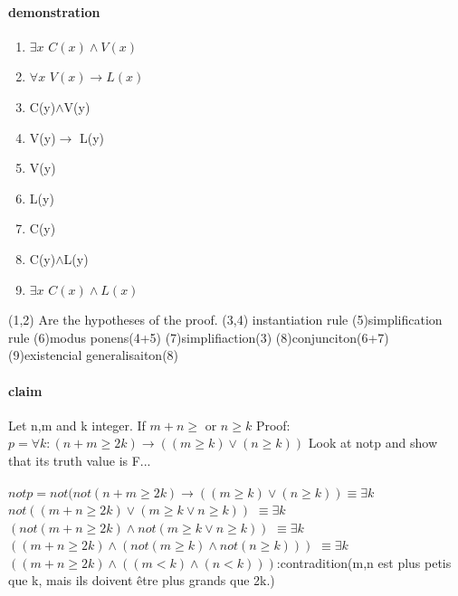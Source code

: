 \documentclass[a4paper,10pt]{article}
\begin{document}
\paragraph{demonstration}
\begin{enumerate}
 \item $\exists x$ $C(x)\wedge V(x)$
 \item $\forall x$ $V(x)\longrightarrow L(x)$
 \item C(y)$\wedge$V(y)
 \item V(y)$\longrightarrow$ L(y)
 \item V(y)
 \item L(y)
 \item C(y)
 \item C(y)$\wedge$L(y)
 \item $\exists x$ $C(x)\wedge L(x)$
\end{enumerate}

(1,2) Are the hypotheses of the proof.
\newline
(3,4) instantiation rule 
\newline
(5)simplification rule 
\newline
(6)modus ponens(4+5)
\newline
(7)simplifiaction(3)
\newline
(8)conjunciton(6+7)
\newline
(9)existencial generalisaiton(8)
\paragraph{claim}
Let n,m and k integer. If $m+n\geq$ or $n\geq k$
\newline
Proof:
$p=\forall k:(n+m\geq 2k)\longrightarrow((m\geq k)\vee(n\geq k))$
\newline
Look at notp and show that its truth value is F...
\paragraph{}
$notp=not(not(n+m\geq 2k)\longrightarrow((m\geq k)\vee(n\geq k))\equiv \exists k$ $not((m+n\geq 2k)\vee(m\geq k\vee n\geq k))$
\newline
$\equiv \exists k$ $(not(m+n\geq 2k)\wedge not(m\geq k\vee n\geq k))$
\newline
$\equiv \exists k$ $((m+n\geq 2k)\wedge (not(m\geq k)\wedge not(n\geq k)))$
\newline
$\equiv \exists k$ $((m+n\geq 2k)\wedge ((m< k)\wedge (n< k)))$:contradition(m,n est plus petis que k, mais ils doivent être plus grands que 2k.)
\end{document}
